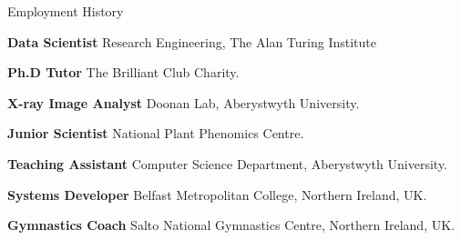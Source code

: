 \begin{rubric}{Employment History}

	\textbf{Data Scientist} Research Engineering, The Alan Turing Institute

\entry*[2019 -- 2022]%
	\textbf{Ph.D Tutor} The Brilliant Club Charity.

\entry*[2017 -- 2018]%
	\textbf{X-ray Image Analyst} Doonan Lab, Aberystwyth University.

\entry*[2016 -- 2017]%
	\textbf{Junior Scientist} National Plant Phenomics Centre.

\entry*[2015 -- 2018]%
	\textbf{Teaching Assistant} Computer Science Department, Aberystwyth
	University.
	
\entry*[2013 -- 2014]%
	\textbf{Systems Developer} Belfast Metropolitan College, Northern Ireland, UK.

\entry*[2013 -- 2014]%
	\textbf{Gymnastics Coach} Salto National Gymnastics Centre, Northern Ireland, UK.
%
\end{rubric}